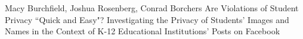 \documentclass[a4paper,landscape]{article} %
\begin{document}
    {Macy Burchfield, Joshua Rosenberg, Conrad Borchers}
    {Are Violations of Student Privacy ``Quick and Easy"? Investigating the Privacy of Students' Images and Names in the Context of K-12 Educational Institutions' Posts on Facebook}
\hfill
\end{document}
